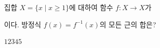 \hspace*{2mm}\begin{minipage}[t]{\dimexpr\linewidth-2mm\relax}\vspace{0pt}
집합 $X=\{x \mid x\ge 1\}$에 대하여 함수 $f:X\longrightarrow X$가\par\smallskip{}\par\smallskip\noindent 이다. 방정식 $f(x)=f^{-1}(x)$의 모든 근의 합은?
\begin{choices32}{$1$}{$2$}{$3$}{$4$}{$5$}\end{choices32}\end{minipage}
